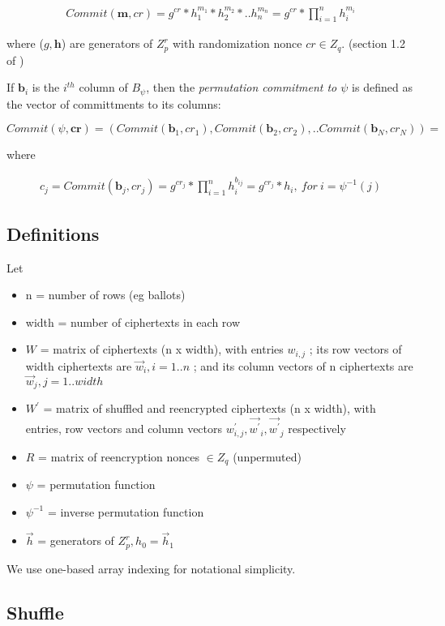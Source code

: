 \documentclass{article}
\begin{document}
\begin{align*}
Commit(\textbf{m},cr)=g^{cr}*h_{1}^{m_{1}}*h_{2}^{m_{2}}*..h_{n}^{m_{n}}=g^{cr}*\prod_{i=1}^{n}h_{i}^{m_{i}}
\end{align*}

where ($g,\textbf{h}$) are generators of $Z_{p}^{r}$ with randomization
nonce $cr\in Z_{q}$. (section 1.2 of )

If $\textbf{b}_{i}$ is the $i^{th}$ column of $B_{\psi}$, then
the \emph{permutation commitment to $\psi$} is defined as the vector
of committments to its columns:

\[
Commit(\psi,\textbf{cr})=(Commit(\textbf{b}_{1},cr_{1}),Commit(\textbf{b}_{2},cr_{2}),..Commit(\textbf{b}_{N},cr_{N}))=
\]

where

\begin{align*}
c_{j}=Commit(\textbf{b}_{j},cr_{j})=g^{cr_{j}}*\prod_{i=1}^{n}h_{i}^{b_{ij}}=g^{cr_{j}}*h_{i},\ for\ i=\psi^{-1}(j)
\end{align*}


\subsection*{Definitions}

Let
\begin{itemize}
\item n = number of rows (eg ballots) 
\item width = number of ciphertexts in each row 
\item $W$ = matrix of ciphertexts (n x width), with entries $w_{i,j}$
; its row vectors of width ciphertexts are $\vec{w}_{i},i=1..n$ ;
and its column vectors of n ciphertexts are $\vec{w}_{j},j=1..width$ 
\item $W^{\prime}$ = matrix of shuffled and reencrypted ciphertexts (n
x width), with entries, row vectors and column vectors $w_{i,j}^{\prime},\vec{w^{\prime}}_{i},\vec{w^{\prime}}_{j}$
respectively 
\item $R$ = matrix of reencryption nonces $\in Z_{q}$ (unpermuted) 
\item $\psi$ = permutation function 
\item $\psi^{-1}$ = inverse permutation function 
\item $\vec{h}$ = generators of $Z_{p}^{r},h_{0}=\vec{h}_{1}$ 
\end{itemize}
We use one-based array indexing for notational simplicity.

\subsection*{Shuffle}
\end{document}
